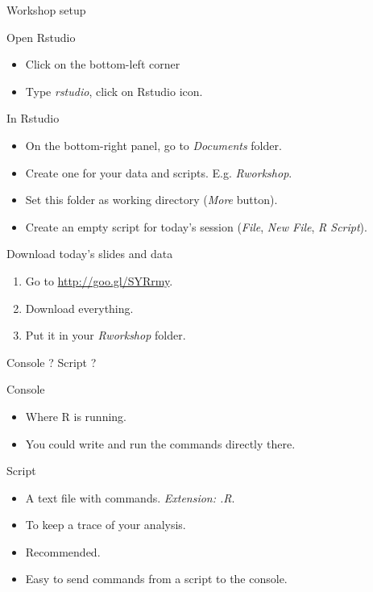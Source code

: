 \documentclass[10pt]{beamer}
\begin{document}
\begin{frame}{Workshop setup}
  \begin{block}{Open {\sf Rstudio}}
    \begin{itemize}
    \item Click on the bottom-left corner
    \item Type {\it rstudio}, click on {\sf Rstudio} icon.
    \end{itemize}
  \end{block}
  \begin{block}{In {\sf Rstudio}}
    \begin{itemize}
    \item On the bottom-right panel, go to {\it Documents} folder.
    \item Create one for your data and scripts. E.g. {\it Rworkshop}.
    \item Set this folder as working directory ({\it More} button).
    \item Create an empty script for today's session ({\it File}, {\it New File}, {\it R Script}).
    \end{itemize}
  \end{block}
  \begin{block}{Download today's slides and data}
    \begin{enumerate}
    \item Go to \url{http://goo.gl/SYRrmy}.
    \item Download everything.
    \item Put it in your {\it Rworkshop} folder.
    \end{enumerate}
  \end{block}

\end{frame}

\begin{frame}{Console ? Script ?}
  \begin{block}{Console}
    \begin{itemize}
    \item Where R is running.
    \item You could write and run the commands directly there.
    \end{itemize}
  \end{block}
  \begin{block}{Script}
    \begin{itemize}
    \item A text file with commands. {\it Extension: .R}.
    \item To keep a trace of your analysis.
    \item Recommended.
    \item Easy to send commands from a script to the console.
    \end{itemize}
  \end{block}
\end{frame}
\end{document}
